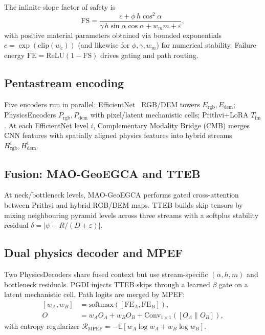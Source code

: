 The infinite-slope factor of safety is
\begin{equation}
\mathrm{FS}=\frac{c+\phi\, h\cos^{2}\alpha}{\gamma\, h\sin\alpha\cos\alpha + w_m m+\varepsilon},
\end{equation}
with positive material parameters obtained via bounded exponentials $c=\exp(\mathrm{clip}(w_c))$ (and likewise for $\phi,\gamma,w_m$) for numerical stability. Failure energy $\mathrm{FE}=\mathrm{ReLU}(1-\mathrm{FS})$ drives gating and path routing.

\subsection{Pentastream encoding}
Five encoders run in parallel: EfficientNet~\cite{tan2019efficientnet} RGB/DEM towers $E_{\mathrm{rgb}},E_{\mathrm{dem}}$; PhysicsEncoders $P_{\mathrm{rgb}},P_{\mathrm{dem}}$ with pixel/latent mechanistic cells; Prithvi$+$LoRA $T_{\mathrm{fm}}$. At each EfficientNet level $i$, Complementary Modality Bridge (CMB) merges CNN features with spatially aligned physics features into hybrid streams $H_{\mathrm{rgb}}^i,H_{\mathrm{dem}}^i$.

\subsection{Fusion: MAO-GeoEGCA and TTEB}
At neck/bottleneck levels, MAO-GeoEGCA performs gated cross-attention between Prithvi and hybrid RGB/DEM maps. TTEB builds skip tensors by mixing neighbouring pyramid levels across three streams with a softplus stability residual $\delta=|\psi-R/(D+\varepsilon)|$.

\subsection{Dual physics decoder and MPEF}
Two PhysicsDecoders share fused context but use stream-specific $(\alpha,h,m)$ and bottleneck residuals. PGDI injects TTEB skips through a learned $\beta$ gate on a latent mechanistic cell. Path logits are merged by MPEF:
\begin{equation}
\begin{split}
[w_A,w_B] &= \mathrm{softmax}([\mathrm{FE}_A,\mathrm{FE}_B]), \\
O &= w_A O_A+w_B O_B+\mathrm{Conv}_{1\times1}([O_A\|O_B]),
\end{split}
\end{equation}
with entropy regularizer $\mathcal{R}_{\mathrm{MPEF}}=-\mathbb{E}[w_A\log w_A+w_B\log w_B]$.

